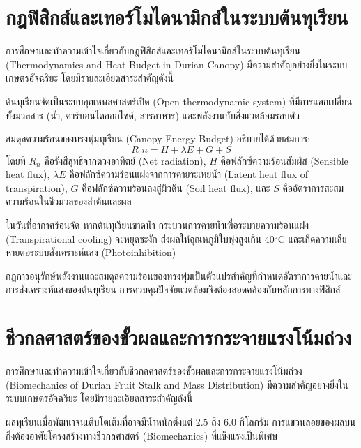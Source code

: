 
\section{กฎฟิสิกส์และเทอร์โมไดนามิกส์ในระบบต้นทุเรียน}

การศึกษาและทำความเข้าใจเกี่ยวกับกฎฟิสิกส์และเทอร์โมไดนามิกส์ในระบบต้นทุเรียน (Thermodynamics and Heat Budget in Durian Canopy) มีความสำคัญอย่างยิ่งในระบบเกษตรอัจฉริยะ โดยมีรายละเอียดสาระสำคัญดังนี้

ต้นทุเรียนจัดเป็นระบบอุณหพลศาสตร์เปิด (Open thermodynamic system) ที่มีการแลกเปลี่ยนทั้งมวลสาร (น้ำ, คาร์บอนไดออกไซด์, สารอาหาร) และพลังงานกับสิ่งแวดล้อมรอบตัว

สมดุลความร้อนของทรงพุ่มทุเรียน (Canopy Energy Budget) อธิบายได้ด้วยสมการ:
\[ R\_n = H + \lambda E + G + S \]
โดยที่ $R_n$ คือรังสีสุทธิจากดวงอาทิตย์ (Net radiation), $H$ คือฟลักซ์ความร้อนสัมผัส (Sensible heat flux), $\lambda E$ คือฟลักซ์ความร้อนแฝงจากการคายระเหยน้ำ (Latent heat flux of transpiration), $G$ คือฟลักซ์ความร้อนลงสู่ผิวดิน (Soil heat flux), และ $S$ คืออัตราการสะสมความร้อนในชีวมวลของลำต้นและผล

ในวันที่อากาศร้อนจัด หากต้นทุเรียนขาดน้ำ กระบวนการคายน้ำเพื่อระบายความร้อนแฝง (Transpirational cooling) จะหยุดชะงัก ส่งผลให้อุณหภูมิใบพุ่งสูงเกิน 40$^{\circ}$C และเกิดความเสียหายต่อระบบสังเคราะห์แสง (Photoinhibition)

\begin{conceptbox}
กฎการอนุรักษ์พลังงานและสมดุลความร้อนของทรงพุ่มเป็นตัวแปรสำคัญที่กำหนดอัตราการคายน้ำและการสังเคราะห์แสงของต้นทุเรียน การควบคุมปัจจัยแวดล้อมจึงต้องสอดคล้องกับหลักการทางฟิสิกส์
\end{conceptbox}

\section{ชีวกลศาสตร์ของขั้วผลและการกระจายแรงโน้มถ่วง}

การศึกษาและทำความเข้าใจเกี่ยวกับชีวกลศาสตร์ของขั้วผลและการกระจายแรงโน้มถ่วง (Biomechanics of Durian Fruit Stalk and Mass Distribution) มีความสำคัญอย่างยิ่งในระบบเกษตรอัจฉริยะ โดยมีรายละเอียดสาระสำคัญดังนี้

ผลทุเรียนเมื่อพัฒนาจนเติบโตเต็มที่อาจมีน้ำหนักตั้งแต่ 2.5 ถึง 6.0 กิโลกรัม การแขวนลอยของผลบนกิ่งต้องอาศัยโครงสร้างทางชีวกลศาสตร์ (Biomechanics) ที่แข็งแรงเป็นพิเศษ

